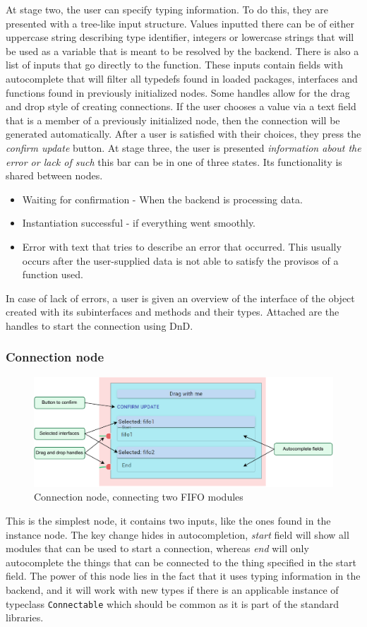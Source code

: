\documentclass[12pt]{report}
\begin{document}
At stage two, the user can specify typing information. To do this, they are presented with a tree-like input structure. Values inputted there can be of either uppercase string describing type identifier, integers or lowercase strings that will be used as a variable that is meant to be resolved by the backend. There is also a list of inputs that go directly to the function. These inputs contain fields with autocomplete that will filter all typedefs found in loaded packages, interfaces and functions found in previously initialized nodes. Some handles allow for the drag and drop style of creating connections. If the user chooses a value via a text field that is a member of a previously initialized node, then the connection will be generated automatically. 
After a user is satisfied with their choices, they press the \emph{confirm update} button. 
At stage three, the user is presented \emph{information about the error or lack of such} this bar can be in one of three states. Its functionality is shared between nodes. 
\begin{itemize} 
   \item Waiting for confirmation - When the backend is processing data. 
   \item Instantiation successful - if everything went smoothly. 
   \item Error with text that tries to describe an error that occurred. This usually occurs after the user-supplied data is not able to satisfy the provisos of a function used. 
\end{itemize}  
In case of lack of errors, a user is given an overview of the interface of the object created with its subinterfaces and methods and their types. Attached are the handles to start the connection using DnD. 
\newpage
\subsubsection{Connection node}
\begin{figure}[!h]
\centering
\includegraphics[width=1\columnwidth]{pdfExports/LargeMap-ConnectionNode.drawio.pdf}
\caption{Connection node, connecting two FIFO modules}
\end{figure}
This is the simplest node, it contains two inputs, like the ones found in the instance node. The key change hides in autocompletion, \emph{start} field will show all modules that can be used to start a connection, whereas \emph{end} will only autocomplete the things that can be connected to the thing specified in the start field. The power of this node lies in the fact that it uses typing information in the backend, and it will work with new types if there is an applicable instance of typeclass \verb!Connectable! which should be common as it is part of the standard libraries.
\end{document}
